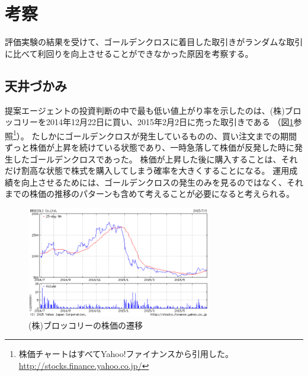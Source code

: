 \documentclass[twocolumn,jsaiac]{jarticle}
\begin{document}
\section{考察}
評価実験の結果を受けて、ゴールデンクロスに着目した取引きがランダムな取引に比べて利回りを向上させることができなかった原因を考察する。

\subsection{天井づかみ}
提案エージェントの投資判断の中で最も低い値上がり率を示したのは、(株)ブロッコリーを2014年12月22日に買い、2015年2月2日に売った取引きである
（図\ref{fig:broccoli}参照\footnote{株価チャートはすべてYahoo!ファイナンスから引用した。\url{http://stocks.finance.yahoo.co.jp/}}）。
たしかにゴールデンクロスが発生しているものの、買い注文までの期間ずっと株価が上昇を続けている状態であり、一時急落して株価が反発した時に発生したゴールデンクロスであった。
株価が上昇した後に購入することは、それだけ割高な状態で株式を購入してしまう確率を大きくすることになる。
運用成績を向上させるためには、ゴールデンクロスの発生のみを見るのではなく、それまでの株価の推移のパターンも含めて考えることが必要になると考えられる。
\begin{figure}[htb]
\begin{center}
\includegraphics[width=8cm,clip]{broccoli.png}
\end{center}
\caption{(株)ブロッコリーの株価の遷移}
\label{fig:broccoli}
\end{figure}
\end{document}

